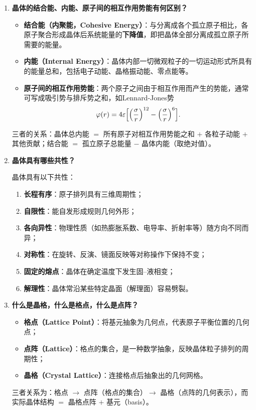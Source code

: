 \begin{enumerate}[label=\textbf{\arabic*.}, leftmargin=2em, itemsep=0.8em]
\item \textbf{晶体的结合能、内能、原子间的相互作用势能有何区别？}

\begin{itemize}[nosep]
    \item \textbf{结合能（内聚能，Cohesive Energy）}：与分离成各个孤立原子相比，各原子聚合形成晶体后系统能量的\textbf{下降值}，即把晶体全部分离成孤立原子所需要的能量。
    \item \textbf{内能（Internal Energy）}：晶体内部一切微观粒子的一切运动形式所具有的能量总和，包括电子动能、晶格振动能、零点能等。
    \item \textbf{原子间的相互作用势能}：两个原子之间由于相互作用而产生的势能，通常可写成吸引势与排斥势之和，如Lennard-Jones势
    \[
        \varphi(r) = 4\varepsilon\Bigl[\Bigl(\frac{\sigma}{r}\Bigr)^{12} - \Bigl(\frac{\sigma}{r}\Bigr)^{6}\Bigr].
    \]
\end{itemize}
三者的关系：晶体总内能 $=$ 所有原子对相互作用势能之和 $+$ 各粒子动能 $+$ 其他贡献；结合能 $=$ 孤立原子总能量 $-$ 晶体内能（取绝对值）。

\item \textbf{晶体具有哪些共性？}

晶体具有以下共性：
\begin{enumerate}[nosep, label=(\arabic*)]
    \item \textbf{长程有序}：原子排列具有三维周期性；
    \item \textbf{自限性}：能自发形成规则几何外形；
    \item \textbf{各向异性}：物理性质（如热膨胀系数、电导率、折射率等）随方向不同而异；
    \item \textbf{对称性}：在旋转、反演、镜面反映等对称操作下保持不变；
    \item \textbf{固定的熔点}：晶体在确定温度下发生固--液相变；
    \item \textbf{解理性}：晶体常沿某些特定晶面（解理面）容易劈裂。
\end{enumerate}

\item \textbf{什么是晶格，什么是格点，什么是点阵？}

\begin{itemize}[nosep]
    \item \textbf{格点（Lattice Point）}：将基元抽象为几何点，代表原子平衡位置的几何点；
    \item \textbf{点阵（Lattice）}：格点的集合，是一种数学抽象，反映晶体粒子排列的周期性；
    \item \textbf{晶格（Crystal Lattice）}：连接格点后抽象出的几何网格。
\end{itemize}
三者关系为：格点 $\to$ 点阵（格点的集合）$\to$ 晶格（点阵的几何表示），而实际晶体结构 $=$ 晶格点阵 $+$ 基元（basis）。


\end{enumerate}
